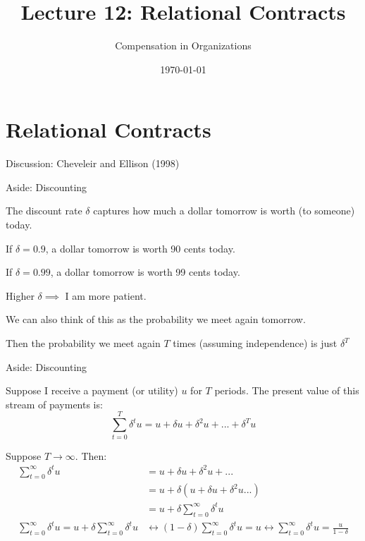 \documentclass[aspectratio=169,usenames,dvipsnames]{beamer}
\title[diss]{Lecture 12: Relational Contracts} %
\author{Compensation in Organizations} %
\institute[shortinst]{Jacob Kohlhepp}
\date{\today} %
\newenvironment{wideitemize}{\itemize\addtolength{\itemsep}{10pt}}{\enditemize}
\begin{document}
\begin{frame}
\titlepage %

\end{frame}


\section{Relational Contracts}


\begin{frame}
\centering
    \huge Discussion: Cheveleir and Ellison (1998)

\end{frame}

\begin{frame}{Aside: Discounting}
\begin{wideitemize}
    \item The discount rate $\delta$ captures how much a dollar tomorrow is worth (to someone) today.
    \item If $\delta=0.9$, a dollar tomorrow is worth 90 cents today.
    \item If $\delta=0.99$, a dollar tomorrow is worth 99 cents today.
    \item Higher $\delta \implies$ I am more patient.
    \item We can also think of this as the probability we meet again tomorrow.
    \item Then the probability we meet again $T$ times (assuming independence) is just $\delta^T$
\end{wideitemize}
    
\end{frame}


\begin{frame}{Aside: Discounting}
\begin{wideitemize}
    \item Suppose I receive a payment (or utility) $u$ for $T$ periods. The present value of this stream of payments is:
    \[\sum_{t=0}^T \delta^t u=u+\delta u +\delta^2 u+...+\delta^Tu\]
    \pause
    \item Suppose $T\to \infty$. Then:
    \begin{align*}
        \sum_{t=0}^\infty \delta^t u&=u+\delta u +\delta^2 u+...\\
        &= u + \delta (u + \delta u + \delta^2 u...)\\
        &=  u + \delta  \sum_{t=0}^\infty \delta^t u\\
        \sum_{t=0}^\infty \delta^t u = u + \delta  \sum_{t=0}^\infty \delta^t u &\leftrightarrow (1-\delta)\sum_{t=0}^\infty \delta^t u  = u \leftrightarrow \sum_{t=0}^\infty \delta^t u = \frac{u}{1-\delta}
    \end{align*}
\end{wideitemize}
\end{frame}
\end{document}
